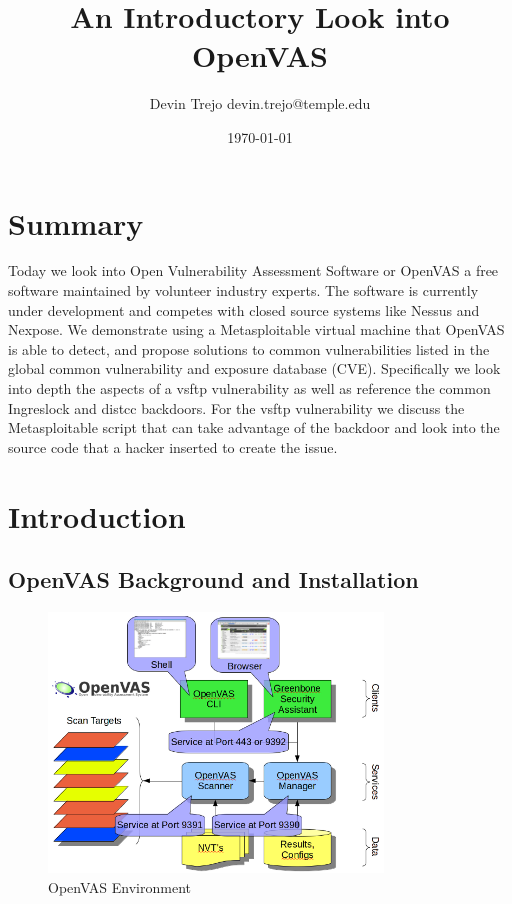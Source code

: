 \documentclass[12pt]{article}
\begin{document}
\title{An Introductory Look into OpenVAS}
\author{Devin Trejo \tabularnewline devin.trejo@temple.edu }
\date{\today}
\maketitle

\section{Summary}
\label{sect:summary}
Today we look into Open Vulnerability Assessment Software or OpenVAS 
a free software maintained by volunteer industry experts. The software is
currently under development and competes with closed source systems like
Nessus and Nexpose. We demonstrate using a Metasploitable virtual machine
that OpenVAS is able to detect, and propose solutions to common vulnerabilities
listed in the global common vulnerability and exposure database (CVE). 
Specifically we look into depth the aspects of a vsftp vulnerability as 
well as reference the common Ingreslock and distcc backdoors. For the vsftp
vulnerability we discuss the Metasploitable script that can take advantage
of the backdoor and look into the source code that a hacker inserted to create
the issue.

\section{Introduction}
\label{sect:intro}
\subsection{OpenVAS Background and Installation}
\label{sec:background}

\begin{figure}[ht]
    \centering
    \includegraphics[width=3.5in]{images/openvas-7-enviorment.png}
    \caption{OpenVAS Environment}
    \label{fig:openvasenv}
\end{figure}
\end{document}
